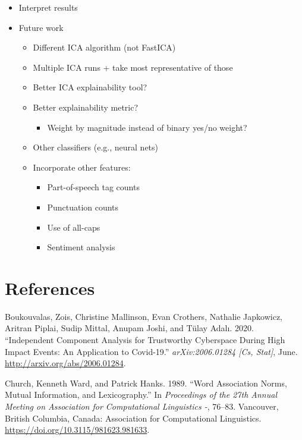 \documentclass{article}
\begin{document}
\begin{itemize}
\tightlist
\item
  Interpret results
\item
  Future work

  \begin{itemize}
  \tightlist
  \item
    Different ICA algorithm (not FastICA)
  \item
    Multiple ICA runs + take most representative of those
  \item
    Better ICA explainability tool?
  \item
    Better explainability metric?

    \begin{itemize}
    \tightlist
    \item
      Weight by magnitude instead of binary yes/no weight?
    \end{itemize}
  \item
    Other classifiers (e.g., neural nets)
  \item
    Incorporate other features:

    \begin{itemize}
    \tightlist
    \item
      Part-of-speech tag counts
    \item
      Punctuation counts
    \item
      Use of all-caps
    \item
      Sentiment analysis
    \end{itemize}
  \end{itemize}
\end{itemize}

\newpage

\hypertarget{references}{%
\section*{References}\label{references}}

\hypertarget{refs}{}
\leavevmode\hypertarget{ref-boukouvalas_independent_2020}{}%
Boukouvalas, Zois, Christine Mallinson, Evan Crothers, Nathalie
Japkowicz, Aritran Piplai, Sudip Mittal, Anupam Joshi, and Tülay Adalı.
2020. ``Independent Component Analysis for Trustworthy Cyberspace During
High Impact Events: An Application to Covid-19.'' \emph{arXiv:2006.01284
{[}Cs, Stat{]}}, June. \url{http://arxiv.org/abs/2006.01284}.

\leavevmode\hypertarget{ref-church_word_1989}{}%
Church, Kenneth Ward, and Patrick Hanks. 1989. ``Word Association Norms,
Mutual Information, and Lexicography.'' In \emph{Proceedings of the 27th
Annual Meeting on Association for Computational Linguistics -}, 76--83.
Vancouver, British Columbia, Canada: Association for Computational
Linguistics. \url{https://doi.org/10.3115/981623.981633}.
\end{document}
